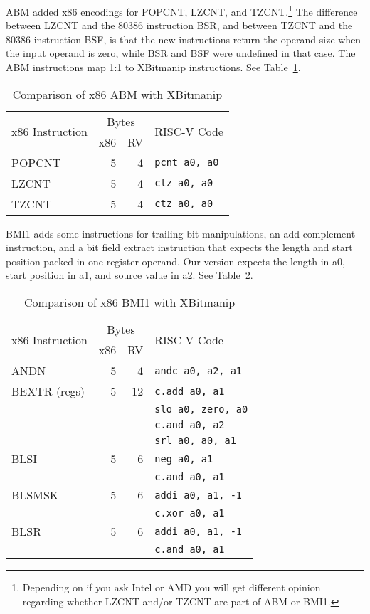 ABM added x86 encodings for POPCNT, LZCNT, and TZCNT.\footnote{Depending on if
you ask Intel or AMD you will get different opinion regarding whether LZCNT
and/or TZCNT are part of ABM or BMI1.} The difference between LZCNT and the
80386 instruction BSR, and between TZCNT and the 80386 instruction BSF, is that
the new instructions return the operand size when the input operand is zero,
while BSR and BSF were undefined in that case. The ABM instructions map 1:1 to
XBitmanip instructions.  See Table~\ref{abm-comp}.

\begin{table}[h]
\centering
\begin{tabular}{lrrl}
\multirow{2}{*}{x86 Instruction} & \multicolumn{2}{c}{Bytes} & \multirow{2}{*}{RISC-V Code} \\
& x86 & RV & \\
\hline
POPCNT  & 5 &  4 & {\tt pcnt a0, a0} \\
\hline
LZCNT   & 5 &  4 & {\tt clz a0, a0} \\
\hline
TZCNT   & 5 &  4 & {\tt ctz a0, a0} \\
\end{tabular}
\caption{Comparison of x86 ABM with XBitmanip}
\label{abm-comp}
\end{table}

BMI1 adds some instructions for trailing bit manipulations, an add-complement instruction,
and a bit field extract instruction that expects the length and start position packed in one
register operand. Our version expects the length in a0, start position in a1, and source
value in a2. See Table~\ref{bmi1-comp}.

\begin{table}[h]
\centering
\begin{tabular}{lrrl}
\multirow{2}{*}{x86 Instruction} & \multicolumn{2}{c}{Bytes} & \multirow{2}{*}{RISC-V Code} \\
& x86 & RV & \\
\hline
ANDN    & 5 &  4 & {\tt andc a0, a2, a1} \\
\hline
BEXTR (regs)  & 5 & 12 & {\tt c.add a0, a1} \\
              &   &    & {\tt slo a0, zero, a0} \\
              &   &    & {\tt c.and a0, a2} \\
              &   &    & {\tt srl a0, a0, a1} \\
\hline
BLSI          & 5 &  6 & {\tt neg a0, a1} \\
              &   &    & {\tt c.and a0, a1} \\
\hline
BLSMSK        & 5 &  6 & {\tt addi a0, a1, -1} \\
              &   &    & {\tt c.xor a0, a1} \\
\hline
BLSR          & 5 &  6 & {\tt addi a0, a1, -1} \\
              &   &    & {\tt c.and a0, a1} \\
\end{tabular}
\caption{Comparison of x86 BMI1 with XBitmanip}
\label{bmi1-comp}
\end{table}

